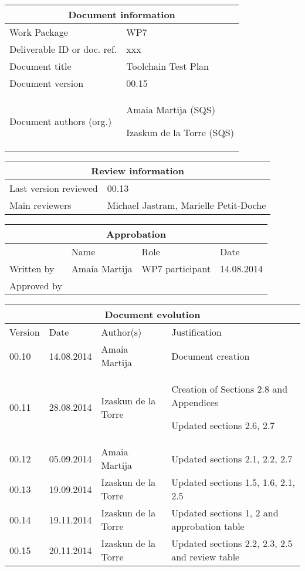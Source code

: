 \documentclass{template/openetcs_report}
\begin{document}
\begin{tabular}{|p{4.4cm}|p{8.7cm}|}
\hline
\multicolumn{2}{|c|}{Document information} \\
\hline
Work Package &  WP7  \\
Deliverable ID or doc. ref. & xxx\\
\hline
Document title & Toolchain Test Plan \\
Document version & 00.15 \\
Document authors (org.)  & Amaia Martija (SQS) 

Izaskun de la Torre (SQS)\\
\hline
\end{tabular}

\begin{tabular}{|p{4.4cm}|p{8.7cm}|}
\hline
\multicolumn{2}{|c|}{Review information} \\
\hline
Last version reviewed &  00.13\\
\hline
Main reviewers & Michael Jastram, Marielle Petit-Doche \\
\hline
\end{tabular}

\begin{tabular}{|p{2.2cm}|p{4cm}|p{4cm}|p{2cm}|}
\hline
\multicolumn{4}{|c|}{Approbation} \\
\hline
  &  Name & Role & Date   \\
\hline  
Written by  &  Amaia Martija & WP7 participant & 14.08.2014 \\
\hline
Approved by &  &   &  \\
\hline
\end{tabular}

\begin{tabular}{|p{2.2cm}|p{2cm}|p{3cm}|p{5cm}|}
\hline
\multicolumn{4}{|c|}{Document evolution} \\
\hline
Version &  Date & Author(s) & Justification  \\
\hline  
00.10 & 14.08.2014 & Amaia Martija  &  Document creation  \\
\hline  
00.11 & 28.08.2014 & Izaskun de la Torre  &  Creation of Sections 2.8 and Appendices

Updated sections 2.6, 2.7  \\
\hline 
00.12 & 05.09.2014 & Amaia Martija  &  Updated sections 2.1, 2.2, 2.7  \\
\hline 
00.13 & 19.09.2014 & Izaskun de la Torre  &  Updated sections 1.5, 1.6, 2.1, 2.5\\
\hline   
00.14 & 19.11.2014 & Izaskun de la Torre  &  Updated sections 1, 2 and approbation table\\
\hline
00.15 & 20.11.2014 & Izaskun de la Torre  &  Updated sections 2.2, 2.3, 2.5 and review table\\
\hline   
\end{tabular}
\newpage
\end{document}
